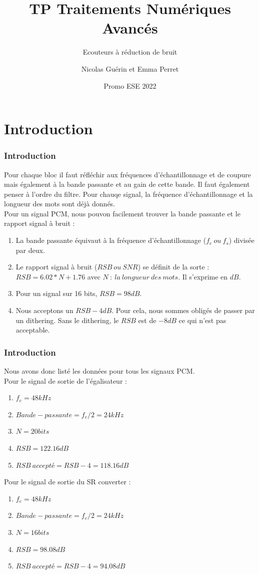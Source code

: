 \documentclass[
10pt,
aspectratio=169,
]{beamer}
\title{TP Traitements Numériques Avancés}
\subtitle{Ecouteurs à réduction de bruit}
\date{Promo ESE 2022}
\author{Nicolas Guérin et Emma Perret}
\begin{document}
\begin{frame}
\titlepage
\end{frame}

\section{Introduction}
\begin{frame} 
\frametitle{Introduction} 
Pour chaque bloc il faut réfléchir aux fréquences d'échantillonnage et de coupure mais également à la bande passante et au gain de cette bande. Il faut également penser à l'ordre du filtre. Pour chauqe signal, la fréquence d'échantillonnage et la longueur des mots sont déjà donnés.\\
Pour un signal PCM, nous pouvon facilement trouver la bande passante et le rapport signal à bruit :
\begin{enumerate} 
\item La bande passante équivaut à la fréquence d'échantillonnage ($f_e ~ ou ~ f_s$) divisée par deux.
\item Le rapport signal à bruit ($RSB ~ ou ~ SNR$) se définit de la sorte : $RSB = 6.02 * N + 1.76 $ avec $N ~ : ~ la ~ longueur ~ des ~ mots$. Il s'exprime en $dB$.
\item Pour un signal sur 16 bits, $RSB = 98 dB$.
\item Nous acceptons un $RSB - 4dB$. Pour cela, nous sommes obligés de passer par un dithering. Sans le dithering, le $RSB$ est de $-8 dB$ ce qui n'est pas acceptable.
\end{enumerate}
\end{frame}

\begin{frame} 
\frametitle{Introduction} 
Nous avons donc listé les données pour tous les signaux PCM.\\
Pour le signal de sortie de l'égalisateur : 
\begin{enumerate} 
\item $f_e = 48 kHz$
\item $Bande-passante = f_e/2 = 24 kHz$
\item $N = 20 bits$
\item $RSB = 122.16 dB$
\item $RSB ~accepté = RSB - 4 = 118.16 dB$
\end{enumerate}
\vspace*{0.7cm}
Pour le signal de sortie du SR converter : 
\begin{enumerate} 
\item $f_e = 48 kHz$
\item $Bande-passante = f_e/2 = 24 kHz$
\item $N = 16 bits$
\item $RSB = 98.08 dB$
\item $RSB ~accepté = RSB - 4 = 94.08 dB$
\end{enumerate}
\end{frame}
\end{document}
